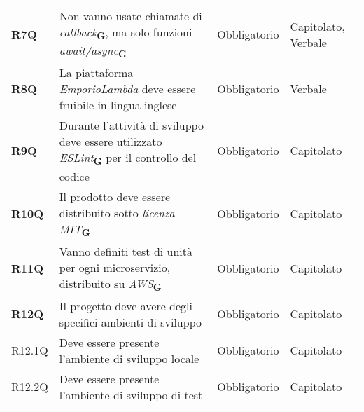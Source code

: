 \begin{center}
\begin{longtable}[!h]{p{50px} p{200px} p{100px} p{50px}}
        \textbf{R7Q}                          & Non vanno usate chiamate di \textit{callback}\textsubscript{\textbf{G}}, \newline ma solo funzioni \textit{await/async}\textsubscript{\textbf{G}}                               & Obbligatorio             & Capitolato, \newline Verbale \\
        \textbf{R8Q}                          & La piattaforma \textit{EmporioLambda} deve essere fruibile in lingua inglese                                                                                                    & Obbligatorio             & Verbale                      \\
        \textbf{R9Q}                          & Durante l'attività di sviluppo deve essere utilizzato \textit{ESLint}\textsubscript{\textbf{G}} per il controllo del codice                                                     & Obbligatorio             & Capitolato                   \\
        \textbf{R10Q}                         & Il prodotto deve essere distribuito sotto \textit{licenza MIT}\textsubscript{\textbf{G}}                                                                                        & Obbligatorio             & Capitolato                   \\
        \textbf{R11Q}                         & Vanno definiti test di unità per ogni microservizio, distribuito su \textit{AWS}\textsubscript{\textbf{G}}                                                                      & Obbligatorio             & Capitolato                   \\
        \textbf{R12Q}                         & Il progetto deve avere degli specifici ambienti di sviluppo                                                                                                                     & Obbligatorio             & Capitolato                   \\
        R12.1Q                                & Deve essere presente l'ambiente di sviluppo locale                                                                                                                              & Obbligatorio             & Capitolato                   \\
        R12.2Q                                & Deve essere presente l'ambiente di sviluppo di test                                                                                                                             & Obbligatorio             & Capitolato                   \\

\end{longtable}
\end{center}

